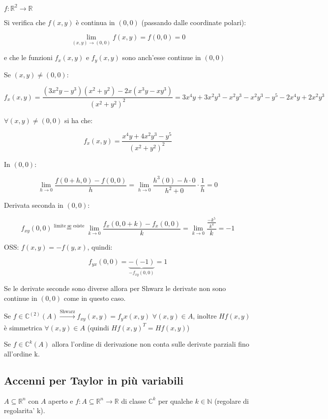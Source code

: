 \documentclass[../appunti-analisi.tex]{subfiles}
\begin{document}
$f: \mathbb{R}^{2} \rightarrow \mathbb{R}$ 

Si verifica che $f(x,y)$ è continua in $(0,0)$ (passando dalle coordinate polari):

\[
    \lim_{ (x,y) \to (0,0) } f(x,y)=f(0,0) = 0
\]

e che le funzioni $f_x(x,y)$ e $f_y(x,y)$ sono anch'esse continue in $(0,0)$

Se $(x,y) \neq (0,0)$:

\[
    f_x(x,y) = \frac{(3x^{2}y-y^{3})(x^{2}+y^{2})-2x(x^{3}y-xy^{3})}{(x^{2}+y^{2})^{2}} = 3x^{4}y+3x^{2}y^{3}-x^{2}y^{3}-x^{2}y^{3}-y^{5}-2x^{4}y+2x^{2}y^{3} 
\]


$\forall (x,y) \neq (0,0)$ si ha che:

\[
f_x(x,y) = \frac{x^{4}y+4x^{2}y^{3}-y^{5}}{(x^{2}+y^{2})^{2}}
\]


In $(0,0)$:

\[
    \lim_{ h \to 0 } \frac{f(0+h,0) - f(0,0)}{h} = \lim_{ h \to 0 } \frac{h^{3}(0) - h\cdot 0}{h^{2}+0} \cdot  \frac{1}{h} = 0
\]


Derivata seconda in $(0,0)$:

\[
    f_{xy} (0,0) \overset{\text{limite se esiste}}{=} \lim_{ k \to 0 } \frac{f_x(0,0+k) - f_x(0,0)}{k} = \lim_{ k \to 0 } \frac{ \frac{-k^{5}}{k^{4}}}{k} = -1
\]

OSS: $f(x,y)=-f(y,x)$, quindi:

\[
    f_{yx}(0,0) = \underbrace{-(-1)}_\text{$-f_{xy}(0,0)$} = 1
\]

Se le derivate seconde sono diverse allora per Shwarz le derivate non sono continue in $(0,0)$ come in questo caso.



Se $f \in \mathbb{C}^{(2)} (A) \xrightarrow[]{\text{Shwarz}} f_{xy}(x,y) = f_yx(x,y)$ $\forall (x,y) \in A$, inoltre $H f(x,y)$ è simmetrica $\forall (x,y) \in A$ (quindi $Hf(x,y)^{T}=Hf(x,y)$)

Se $f \in \mathbb{C}^{k}(A)$ allora l'ordine di derivazione non conta sulle derivate parziali fino all'ordine k.

\subsection{Accenni per Taylor in più variabili}

$A \subseteq \mathbb{R}^{n}$ con $A$ aperto e $f:A \subseteq \mathbb{R}^{n} \rightarrow \mathbb{R}$ di classe $\mathbb{C}^{k}$ per qualche $k \in \mathbb{N}$ (regolare di regolarita' k).
\end{document}
